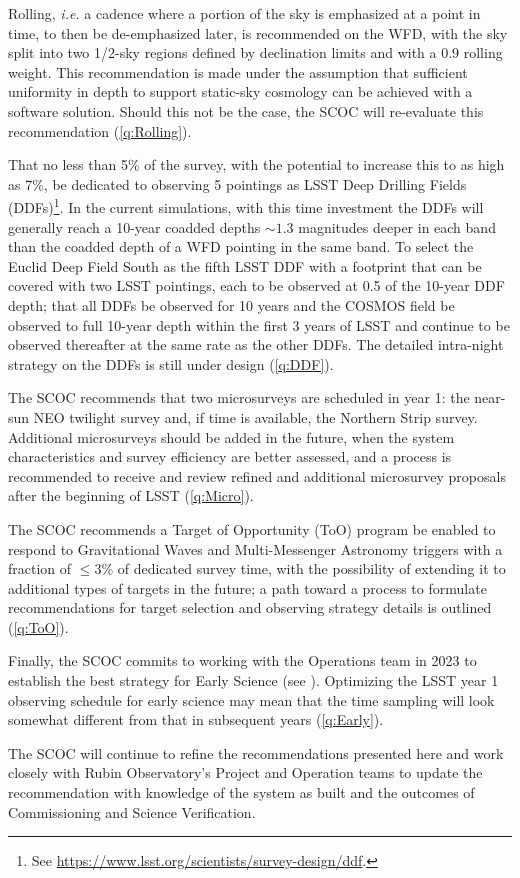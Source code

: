 \hangindent=0.7cm Rolling, \emph{i.e.} a cadence where a portion of the sky is emphasized at a point in time, to then be de-emphasized later, is recommended on the WFD, with the sky split into two 1/2-sky regions defined by declination limits and with a 0.9 rolling weight. This recommendation is made under the assumption that sufficient uniformity in depth to support static-sky cosmology can be achieved with a software solution.  Should this not be the case, the SCOC will re-evaluate this recommendation (\autoref{q:Rolling}).

\hangindent=0.7cm That no less than 5\% of the survey, with the potential to increase this to as high as 7\%, be dedicated to observing 5 pointings as LSST Deep Drilling Fields (DDFs)\footnote{See \url{https://www.lsst.org/scientists/survey-design/ddf}.}. In the current simulations, with this time investment the DDFs will generally reach a 10-year coadded depths $\sim1.3$ magnitudes deeper in each band than the coadded depth of a WFD pointing in the same band. To select the Euclid Deep Field South as the fifth LSST DDF with a footprint that can be covered with two LSST pointings, each to be observed at 0.5 of the 10-year DDF depth;  that all DDFs be observed for 10 years and the COSMOS field be observed to full 10-year depth within the first 3 years of LSST and continue to be observed thereafter at the same rate as the other DDFs. The detailed intra-night strategy on the DDFs is still under design (\autoref{q:DDF}).

\hangindent=0.7cm The SCOC recommends that two microsurveys are scheduled  in year 1: the near-sun NEO twilight survey and, if time is
available, the Northern Strip survey. Additional microsurveys should be added in the future, when the system characteristics and survey efficiency are better assessed, and a process is recommended to receive and review refined and additional microsurvey proposals after the beginning of LSST (\autoref{q:Micro}).

\hangindent=0.7cm The SCOC recommends a Target of Opportunity (ToO) program be enabled to respond to Gravitational Waves and Multi-Messenger Astronomy triggers with a fraction of $\leq 3\%$ of dedicated survey time, with the possibility of extending it to additional types of targets in the future; a path toward a process to formulate recommendations for target selection and observing strategy details is outlined (\autoref{q:ToO}).

\hangindent=0.7cm Finally, the SCOC commits to working with the Operations team in 2023 to establish the best strategy for Early Science (see \citealt{rtn-011}). Optimizing the LSST year 1 observing schedule for early science may mean that the time  sampling will look somewhat different from that in subsequent years (\autoref{q:Early}).

\noindent The SCOC will continue to refine the recommendations presented here and work closely with Rubin Observatory's Project and Operation teams to update the recommendation with knowledge of the system as built and the outcomes of Commissioning and Science Verification.
